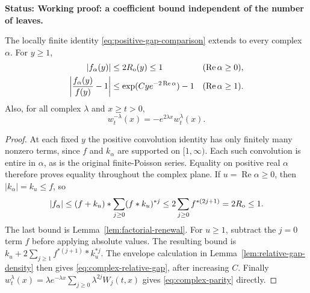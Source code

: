 \documentclass[11pt,letterpaper]{article}
\newcommand{\status}[1]{\textbf{Status: #1.}}
\begin{document}
\status{Working proof: a coefficient bound independent of the number of leaves}

\begin{lemma}
\label{lem:complex-gap-fields}
The locally finite identity \eqref{eq:positive-gap-comparison}
extends to every complex $\alpha$. For $y\ge1$,
\begin{align}
 |f_\alpha(y)|&\le2R_{\rm o}(y)\le1
                                      &&(\operatorname{Re}\alpha\ge0),
                                      \label{eq:complex-gap-bound}\\
 \left|\frac{f_\alpha(y)}{f(y)}-1\right|
   &\le\exp(Cy e^{-2\operatorname{Re}\alpha})-1
                                      &&(\operatorname{Re}\alpha\ge1).
                                      \label{eq:complex-relative-gap}
\end{align}
Also, for all complex $\lambda$ and $x\ge t>0$,
\begin{equation}\label{eq:complex-parity}
 w_t^{-\lambda}(x)=-e^{2\lambda x}w_t^\lambda(x).
\end{equation}
\end{lemma}
\begin{proof}
At each fixed $y$ the positive convolution identity has only
finitely many nonzero terms, since $f$ and $k_\alpha$ are supported
on $[1,\infty)$. Each such convolution is entire in $\alpha$,
as is the original finite-Poisson series. Equality on positive
real $\alpha$ therefore proves equality throughout the complex
plane. If $u=\operatorname{Re}\alpha\ge0$, then
$|k_\alpha|=k_u\le f$, so
\[
 |f_\alpha|\le(f+k_u)*\sum_{j\ge0}(f*k_u)^{*j}
              \le2\sum_{j\ge0}f^{*(2j+1)}=2R_{\rm o}\le1.
\]
The last bound is Lemma~\ref{lem:factorial-renewal}.
For $u\ge1$, subtract the $j=0$ term $f$ before applying absolute
values. The resulting bound is
$k_u+2\sum_{j\ge1}f^{*(j+1)}*k_u^{*j}$.
The envelope calculation in Lemma~\ref{lem:relative-gap-density}
then gives \eqref{eq:complex-relative-gap}, after increasing $C$.
Finally $w_t^\lambda(x)=\lambda e^{-\lambda x}
\sum_{j\ge0}\lambda^{2j}W_j(t,x)$ gives
\eqref{eq:complex-parity} directly.
\end{proof}
\end{document}

